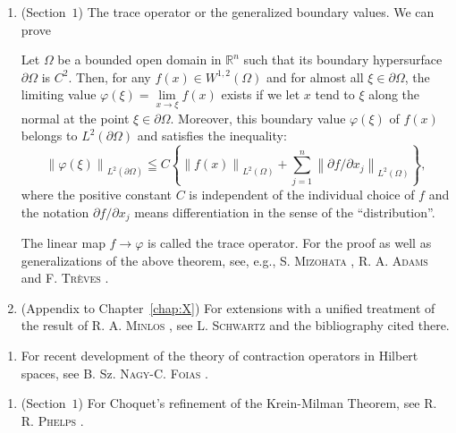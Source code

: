 \label{notes:X}

\begin{enumerate}[1.]
\item (Section~\hyperref[sec:X.1]{$1$}) The trace operator or the generalized boundary values. We can prove 

\begin{theoremu} Let $\Omega$ be a bounded open domain in $\mathbb{R}^{n}$ such that its boundary hypersurface $\partial\Omega$ is $C^2$. Then, for any $f(x) \in W^{1,2}(\Omega)$ and for almost all $\xi \in \partial\Omega$, the limiting value $\varphi(\xi) = \lim\limits_{x \to \xi} f(x)$ exists if we let $x$ tend to $\xi$ along the normal at the point $\xi \in \partial\Omega$. Moreover, this boundary value $\varphi(\xi)$ of $f(x)$ belongs to $L^2(\partial\Omega)$ and satisfies the inequality: 
\[
\left\| \varphi (\xi) \right\| _ {L^{2} (\partial \Omega)} \leqq C \left\{\left\| f (x) \right\| _ {L^{2} (\Omega)} + \sum\limits_{j=1} ^{n} \left\| \partial f / \partial x _{j} \right\| _ {L^{2} (\Omega)} \right\},
\]
where the positive constant $C$ is independent of the individual choice of $f$ and the notation $\partial f/\partial x_{j}$ means differentiation in the sense of the ``distribution''. 
\end{theoremu}

The linear map $f \to \varphi$ is called the trace operator. For the proof as well as generalizations of the above theorem, see, e.g., S. \textsc{Mizohata} \cite{mizohata213}, R. A. \textsc{Adams} \cite{adams2} and F. \textsc{Trèves} \cite{trotter326}. 

\item {}\label{notes:AX} (Appendix to Chapter~\ref{chap:X}) For extensions with a unified treatment of the result of R. A. \textsc{Minlos} \cite{minlos202}, see L. \textsc{Schwartz} \cite{schwartz300} and the bibliography cited there.
\end{enumerate}

\label{notes:XI}

\begin{enumerate}[1.]
\item For recent development of the theory of contraction operators in Hilbert spaces, see B. Sz. \textsc{Nagy}-C. \textsc{Foias} \cite{nagy220}.
\end{enumerate}

\label{notes:XII}

\begin{enumerate}[1.]
\item (Section~\hyperref[sec:XII.1]{$1$}) For Choquet's refinement of the Krein-Milman Theorem, see R. R. \textsc{Phelps} \cite{phelps250}.
\end{enumerate}

